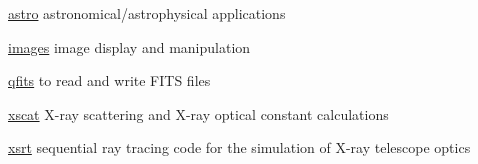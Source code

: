 
\begin{DoxyItemize}
\item \hyperlink{namespaceastro}{astro} astronomical/astrophysical applications
\item \hyperlink{namespaceimages}{images} image display and manipulation
\item \hyperlink{namespaceqfits}{qfits} to read and write F\+I\+TS files
\item \hyperlink{namespacexscat}{xscat} X-\/ray scattering and X-\/ray optical constant calculations
\item \hyperlink{namespacexsrt}{xsrt} sequential ray tracing code for the simulation of X-\/ray telescope optics 
\end{DoxyItemize}